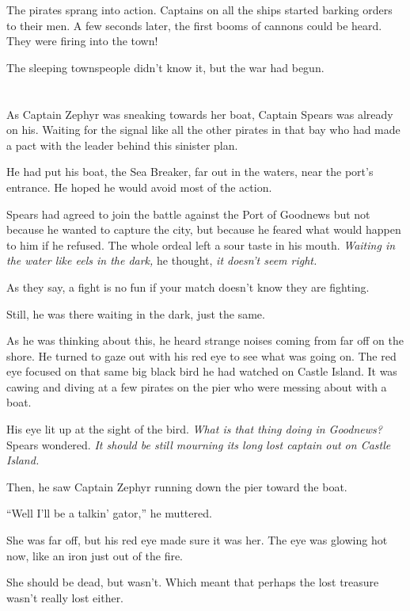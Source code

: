 \documentclass[12pt]{extbook}
\begin{document}
  The pirates sprang into action. Captains on all the ships started
  barking orders to their men. A few seconds later, the first booms of
  cannons could be heard. They were firing into the town!
  
  The sleeping townspeople didn't know it, but the war had begun.
  
  \section{}\label{section-36}
  
  As Captain Zephyr was sneaking towards her boat, Captain Spears was
  already on his. Waiting for the signal like all the other pirates in
  that bay who had made a pact with the leader behind this sinister plan.
  
  He had put his boat, the Sea Breaker, far out in the waters, near the
  port's entrance. He hoped he would avoid most of the action.
  
  Spears had agreed to join the battle against the Port of Goodnews but
  not because he wanted to capture the city, but because he feared what
  would happen to him if he refused. The whole ordeal left a sour taste in
  his mouth. \emph{Waiting in the water like eels in the dark,} he
  thought, \emph{it doesn't seem right.}
  
  As they say, a fight is no fun if your match doesn't know they are
  fighting.
  
  Still, he was there waiting in the dark, just the same.
  
  As he was thinking about this, he heard strange noises coming from far
  off on the shore. He turned to gaze out with his red eye to see what was
  going on. The red eye focused on that same big black bird he had watched
  on Castle Island. It was cawing and diving at a few pirates on the pier
  who were messing about with a boat.
  
  His eye lit up at the sight of the bird. \emph{What is that thing doing
  in Goodnews?} Spears wondered. \emph{It should be still mourning its
  long lost captain out on Castle Island.}
  
  Then, he saw Captain Zephyr running down the pier toward the boat.
  
  \enquote{Well I'll be a talkin' gator,} he muttered.
  
  She was far off, but his red eye made sure it was her. The eye was
  glowing hot now, like an iron just out of the fire.
  
  She should be dead, but wasn't. Which meant that perhaps the lost
  treasure wasn't really lost either.
  
\end{document}

